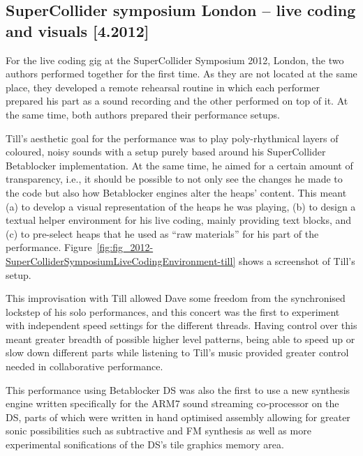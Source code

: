 \documentclass[letterpaper, 12pt]{article}
\begin{document}
\subsection{SuperCollider symposium London -- live coding and visuals [4.2012]}
\label{sub:livecoding_and_visuals}

For the live coding gig at the SuperCollider Symposium 2012, London, the two authors performed together for the first time.
As they are not located at the same place, they developed a remote rehearsal routine in which each performer prepared his part as a sound recording and the other performed on top of it.
At the same time, both authors prepared their performance setups.

Till's aesthetic goal for the performance was to play poly-rhythmical layers of coloured, noisy sounds with a setup purely based around his SuperCollider Betablocker implementation.
At the same time, he aimed for a certain amount of transparency, i.e., it should be possible to not only see the changes he made to the code but also how  Betablocker engines alter the heaps' content.
This meant
(a) to develop a visual representation of the heaps he was playing,
(b) to design a textual helper environment for his live coding, mainly providing text blocks, and
(c) to pre-select heaps that he used as ``raw materials'' for his part of the  performance.
Figure~\ref{fig:fig_2012-SuperColliderSymposiumLiveCodingEnvironment-till} shows a screenshot of Till's setup.


This improvisation with Till allowed Dave some freedom from the synchronised lockstep of his solo performances, and this concert was the first to experiment with independent speed settings for the different threads. Having control over this meant greater breadth of possible higher level patterns, being able to speed up or slow down different parts while listening to Till's music provided greater control needed in collaborative performance.

This performance using Betablocker DS was also the first to use a new synthesis engine written specifically for the ARM7 sound streaming co-processor on the DS, parts of which were written in hand optimised assembly allowing for greater sonic possibilities such as subtractive and FM synthesis as well as more experimental sonifications of the DS's tile graphics memory area.

% 
\parskip 18pt
\end{document}
